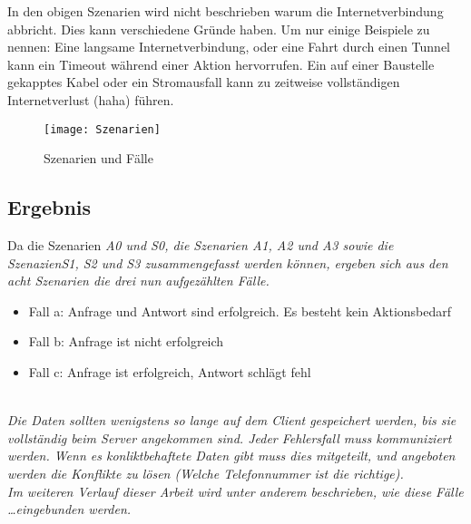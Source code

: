 In den obigen Szenarien wird nicht beschrieben warum die Internetverbindung abbricht. Dies kann verschiedene Gründe haben. Um nur einige Beispiele zu nennen: Eine langsame Internetverbindung, oder eine Fahrt durch einen Tunnel kann ein Timeout während einer Aktion hervorrufen. Ein auf einer Baustelle gekapptes Kabel oder ein Stromausfall kann zu zeitweise vollständigen Internetverlust (haha) führen.
\begin{figure}[H]
  \centering
  \texttt{[image: Szenarien]}
  \grayRule
  \caption[Szenarien]{Szenarien und Fälle}
  \label{fig:scenarios}
\end{figure}
%
%
\subsection*{Ergebnis}
Da die Szenarien \it{A0} und \it{S0}, die Szenarien \it{A1}, \it{A2} und \it{A3} sowie die Szenazien\it{S1}, \it{S2} und \it{S3} zusammengefasst werden können, ergeben sich aus den acht Szenarien die drei nun aufgezählten Fälle.
\begin{itemize}
  \item Fall a: Anfrage und Antwort sind erfolgreich. Es besteht kein Aktionsbedarf 
  \item Fall b: Anfrage ist nicht erfolgreich
  \item Fall c: Anfrage ist erfolgreich, Antwort schlägt fehl
\end{itemize}
\\
\it{Die Daten sollten wenigstens so lange auf dem Client gespeichert werden, bis sie vollständig beim Server angekommen sind. Jeder Fehlersfall muss kommuniziert werden. Wenn es konliktbehaftete Daten gibt muss dies mitgeteilt, und angeboten werden die Konflikte zu lösen (Welche Telefonnummer ist die richtige).}\\
Im weiteren Verlauf dieser Arbeit wird unter anderem beschrieben, wie diese Fälle \ldots  eingebunden werden.